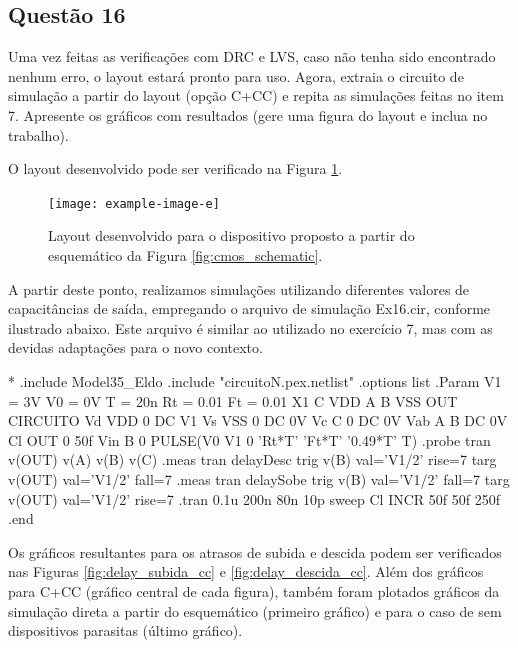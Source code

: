 \documentclass[12pt,a4paper]{article}
\begin{document}
\subsection*{Questão 16}

Uma vez feitas as verificações com DRC e LVS, caso não tenha sido encontrado nenhum erro, o layout estará pronto para uso. Agora, extraia o circuito de simulação a partir do layout (opção C+CC) e repita as simulações feitas no item 7. Apresente os gráficos com resultados (gere uma figura do layout e inclua no trabalho).

O layout desenvolvido pode ser verificado na Figura \ref{fig:layout_developed}.

\begin{figure}[H]
    \centering
    \texttt{[image: example-image-e]}
    \caption{Layout desenvolvido para o dispositivo proposto a partir do esquemático da Figura \ref{fig:cmos_schematic}.}
    \label{fig:layout_developed}
\end{figure}

A partir deste ponto, realizamos simulações utilizando diferentes valores de capacitâncias de saída, empregando o arquivo de simulação Ex16.cir, conforme ilustrado abaixo. Este arquivo é similar ao utilizado no exercício 7, mas com as devidas adaptações para o novo contexto.

\begin{codeblock}[title={Exemplo de Simulação}, label={lst:simulation_example}, listing options={language=TeX}]
*
.include Model35_Eldo
.include "circuitoN.pex.netlist"
.options list
.Param V1 = 3V V0 = 0V T = 20n Rt = 0.01 Ft = 0.01
X1 C VDD A B VSS OUT CIRCUITO
Vd VDD 0 DC V1
Vs VSS 0 DC 0V
Vc C 0 DC 0V
Vab A B DC 0V
Cl OUT 0 50f
Vin B 0 PULSE(V0 V1 0 'Rt*T' 'Ft*T' '0.49*T' T)
.probe tran v(OUT) v(A) v(B) v(C)
.meas tran delayDesc trig v(B) val='V1/2' rise=7 targ v(OUT) val='V1/2'
fall=7
.meas tran delaySobe trig v(B) val='V1/2' fall=7 targ v(OUT) val='V1/2'
rise=7
.tran 0.1u 200n 80n 10p sweep Cl INCR 50f 50f 250f
.end
\end{codeblock}

Os gráficos resultantes para os atrasos de subida e descida podem ser verificados nas Figuras \ref{fig:delay_subida_cc} e \ref{fig:delay_descida_cc}. Além dos gráficos para C+CC (gráfico central de cada figura), também foram plotados gráficos da simulação direta a partir do esquemático (primeiro gráfico) e para o caso de sem dispositivos parasitas (último gráfico).
\end{document}
